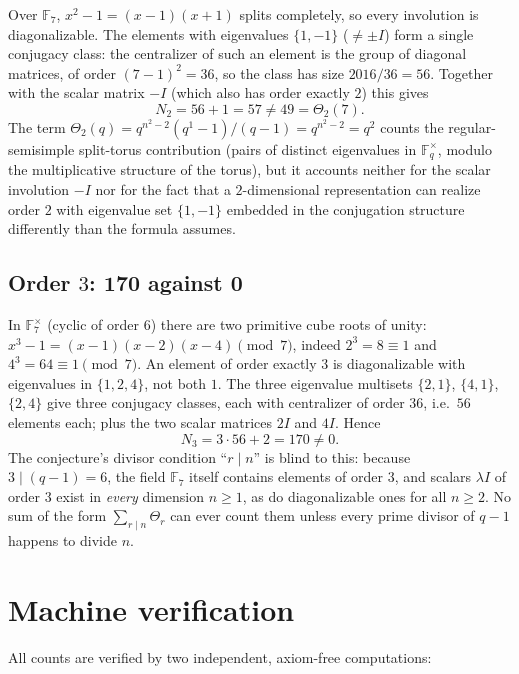 \documentclass[11pt]{article}
\begin{document}
Over $\mathbb{F}_7$, $x^2 - 1 = (x-1)(x+1)$ splits completely, so every
involution is diagonalizable. The elements with eigenvalues $\{1,-1\}$
($\ne \pm I$) form a single conjugacy class: the centralizer of such an element
is the group of diagonal matrices, of order $(7-1)^2 = 36$, so the class has
size $2016/36 = 56$. Together with the scalar matrix $-I$ (which also has order
exactly $2$) this gives
\[
N_2 = 56 + 1 = 57 \ne 49 = \Theta_2(7).
\]
The term $\Theta_2(q) = q^{n^2-2}(q^1-1)/(q-1) = q^{n^2-2} = q^2$ counts the
regular-semisimple split-torus contribution (pairs of distinct eigenvalues in
$\mathbb{F}_q^\times$, modulo the multiplicative structure of the torus), but it
accounts neither for the scalar involution $-I$ nor for the fact that a
$2$-dimensional representation can realize order $2$ with eigenvalue set
$\{1,-1\}$ embedded in the conjugation structure differently than the formula
assumes.

\subsection{Order $3$: $\mathbf{170}$ against $\mathbf{0}$}

In $\mathbb{F}_7^\times$ (cyclic of order $6$) there are two primitive cube
roots of unity: $x^3 - 1 = (x-1)(x-2)(x-4) \pmod 7$, indeed
$2^3 = 8 \equiv 1$ and $4^3 = 64 \equiv 1 \pmod 7$. An element of order
exactly $3$ is diagonalizable with eigenvalues in
$\{1,2,4\}$, not both $1$. The three eigenvalue multisets
$\{2,1\}$, $\{4,1\}$, $\{2,4\}$ give three conjugacy classes, each with
centralizer of order $36$, i.e.\ $56$ elements each; plus the two scalar
matrices $2I$ and $4I$. Hence
\[
N_3 = 3 \cdot 56 + 2 = 170 \ne 0.
\]
The conjecture's divisor condition ``$r \mid n$'' is blind to this: because
$3 \mid (q-1) = 6$, the field $\mathbb{F}_7$ itself contains elements of order
$3$, and scalars $\lambda I$ of order $3$ exist in \emph{every} dimension
$n \ge 1$, as do diagonalizable ones for all $n \ge 2$. No sum of the form
$\sum_{r \mid n} \Theta_r$ can ever count them unless every prime divisor of
$q - 1$ happens to divide $n$.

\section{Machine verification}

All counts are verified by two independent, axiom-free computations:
\end{document}
